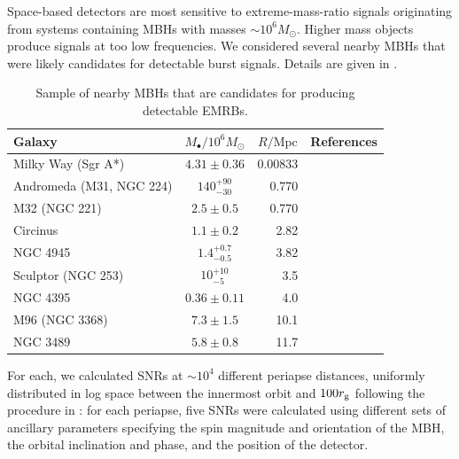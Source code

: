 Space-based detectors are most sensitive to extreme-mass-ratio signals originating from systems containing MBHs with masses $\sim10^6 M_\odot$. Higher mass objects produce signals at too low frequencies. We considered several nearby MBHs that were likely candidates for detectable burst signals. Details are given in .
\begin{table}\footnotesize
 \centering
  \begin{tabular}{P{0.22\textwidth} c  D{.}{.}{2.5} P{0.4\textwidth}}
  \toprule
   Galaxy &  &  & References \\
 \midrule
 Milky Way (Sgr A*) & $4.31 \pm 0.36$ & 0.00833 & \citet{Gillessen2009} \\
 Andromeda (M31, NGC 224) & $140^{+90}_{-30}$ & 0.770 & \citet{Bender2005,Karachentsev2004} \\
 M32 (NGC 221) & $2.5 \pm 0.5$ & 0.770 & \citet{Verolme2002,Karachentsev2004} \\
 Circinus & $1.1 \pm 0.2$ & 2.82 & \citet{Graham2008,Greenhill2003,Karachentsev2007} \\
 NGC 4945 & $1.4^{+0.7}_{-0.5}$ & 3.82 & \citet{Greenhill1997,Ferrarese2005,Karachentsev2007} \\
 Sculptor (NGC 253) & $10^{+10}_{-5}$ & 3.5 & \citet{Graham2011,Rodriguez-Rico2006,Rekola2005} \\
 NGC 4395 & $0.36 \pm 0.11$ & 4.0 & \citet{Peterson2005,Thim2004} \\
 M96 (NGC 3368) & $7.3 \pm 1.5$ & 10.1 & \citet{Graham2011,Nowak2010,Tonry2001} \\
 NGC 3489 & $5.8 \pm 0.8$ & 11.7 & \citet{Graham2011,Nowak2010,Tonry2001} \\
\bottomrule
\end{tabular}
\caption{Sample of nearby MBHs that are candidates for producing detectable EMRBs.\label{tab:MBHs}}
\end{table}
For each, we calculated SNRs at $\sim 10^4$ different periapse distances, uniformly distributed in log space between the innermost orbit and $100 r_\mathrm{g}$ following the procedure in : for each periapse, five SNRs were calculated using different sets of ancillary parameters specifying the spin magnitude and orientation of the MBH, the orbital inclination and phase, and the position of the detector.

